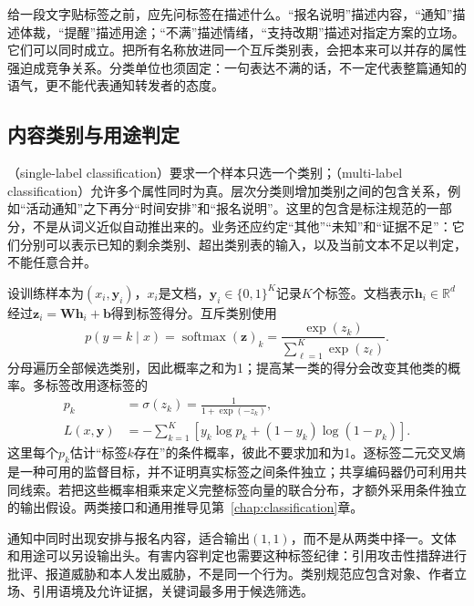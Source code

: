 给一段文字贴标签之前，应先问标签在描述什么。“报名说明”描述内容，“通知”描述体裁，“提醒”描述用途；“不满”描述情绪，“支持改期”描述对指定方案的立场。它们可以同时成立。把所有名称放进同一个互斥类别表，会把本来可以并存的属性强迫成竞争关系。分类单位也须固定：一句表达不满的话，不一定代表整篇通知的语气，更不能代表通知转发者的态度。

\subsection{内容类别与用途判定}
\label{sec:nlp-classification-content}

（single-label classification）要求一个样本只选一个类别；（multi-label classification）允许多个属性同时为真。层次分类则增加类别之间的包含关系，例如“活动通知”之下再分“时间安排”和“报名说明”。这里的包含是标注规范的一部分，不是从词义近似自动推出来的。业务还应约定“其他”“未知”和“证据不足”：它们分别可以表示已知的剩余类别、超出类别表的输入，以及当前文本不足以判定，不能任意合并。

设训练样本为$(x_i,\bm y_i)$，$x_i$是文档，$\bm y_i\in\{0,1\}^{K}$记录$K$个标签。文档表示$\bm h_i\in\mathbb R^d$经过$\bm z_i=\bm W\bm h_i+\bm b$得到标签得分。互斥类别使用
\begin{equation}
  \label{eq:nlp-classification-softmax}
  p(y=k\mid x)=\operatorname{softmax}(\bm z)_k
  =\frac{\exp(z_k)}{\sum_{\ell=1}^{K}\exp(z_\ell)}.
\end{equation}
分母遍历全部候选类别，因此概率之和为1；提高某一类的得分会改变其他类的概率。多标签改用逐标签的
\begin{equation}
  \label{eq:nlp-classification-sigmoid}
  \begin{aligned}
    p_k&=\sigma(z_k)=\frac{1}{1+\exp(-z_k)},\\
    L(x,\bm y)&=-\sum_{k=1}^{K}
    \left[y_k\log p_k+(1-y_k)\log(1-p_k)\right].
  \end{aligned}
\end{equation}
这里每个$p_k$估计“标签$k$存在”的条件概率，彼此不要求加和为1。逐标签二元交叉熵是一种可用的监督目标，并不证明真实标签之间条件独立；共享编码器仍可利用共同线索。若把这些概率相乘来定义完整标签向量的联合分布，才额外采用条件独立的输出假设。两类接口和通用推导见第~\ref{chap:classification}章。

通知中同时出现安排与报名内容，适合输出$(1,1)$，而不是从两类中择一。文体和用途可以另设输出头。有害内容判定也需要这种标签纪律：引用攻击性措辞进行批评、报道威胁和本人发出威胁，不是同一个行为。类别规范应包含对象、作者立场、引用语境及允许证据，关键词最多用于候选筛选。

